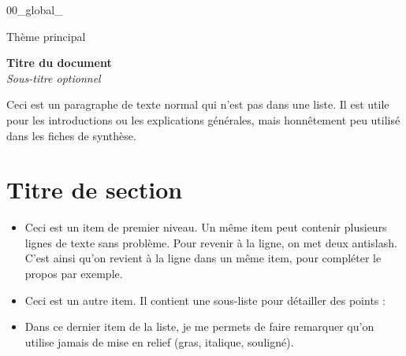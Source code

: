 \documentclass[a4paper,12pt]{article}
\newcommand{\repere}{%
  00\_global\_%
  \twodigit{\month}%
  \twodigit{\day}%
  \twodigit{\currenthour}%
  \twodigit{\currentminute}%
}
\begin{document}
\noindent
\begin{minipage}[t]{0.15\textwidth}
    \small \repere
\end{minipage}%
\begin{minipage}[t]{0.7\textwidth}
    \centering
    \small Thème principal
\end{minipage}

\vspace{-0.2cm}
\noindent
\begin{center}
{\large \textbf{Titre du document}}
\\[0.3cm]
{\small \textit{Sous-titre optionnel}}
\end{center}
\vspace{0.3cm}



\hspace*{2em}Ceci est un paragraphe de texte normal qui n'est pas dans une liste.
Il est utile pour les introductions ou les explications générales, mais honnêtement peu utilisé dans les fiches de synthèse.


\section{Titre de section}

\begin{itemize}
    \item Ceci est un item de premier niveau.
    Un même item peut contenir plusieurs lignes de texte sans problème.
    Pour revenir à la ligne, on met deux antislash. \\
    C'est ainsi qu'on revient à la ligne dans un même item, pour compléter le propos par exemple.

    \item Ceci est un autre item. Il contient une sous-liste pour détailler des points :
    
    \item Dans ce dernier item de la liste, je me permets de faire remarquer qu'on utilise jamais de mise en relief (gras, italique, souligné).
\end{itemize}
\end{document}
